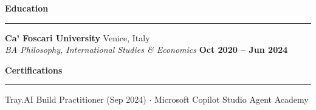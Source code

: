 \documentclass[10pt,a4paper]{article}
\begin{document}
\vspace{1em}
\noindent\textbf{\large Education}
\vspace{0.5em}
\hrule
\vspace{0.5em}
\noindent\textbf{Ca' Foscari University} \hfill Venice, Italy \\
\textit{BA Philosophy, International Studies \& Economics} \hfill \textbf{Oct 2020 -- Jun 2024}

\vspace{1em}
\noindent\textbf{\large Certifications}
\vspace{0.5em}
\hrule
\vspace{0.5em}
\noindent Tray.AI Build Practitioner (Sep 2024) $\cdot$ Microsoft Copilot Studio Agent Academy
\end{document}
